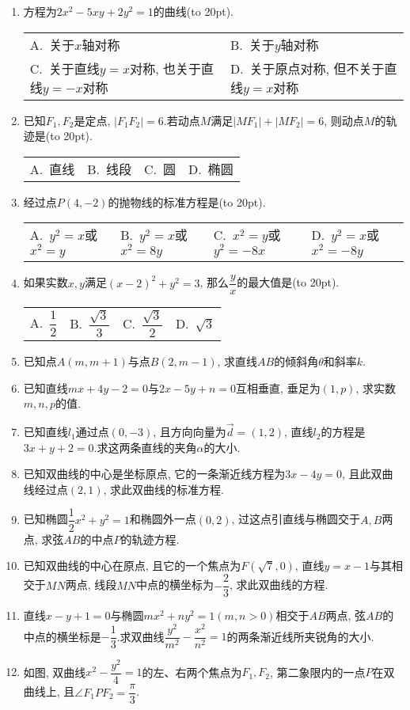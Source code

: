 \documentclass[10pt,a4paper]{article}
\newcommand{\bracket}[1]{(\hbox to #1pt{})}
\newcommand{\twoch}[4]{\par\begin{tabular}{p{.46\textwidth}p{.46\textwidth}}
A.~#1& B.~#2\\
C.~#3& D.~#4
\end{tabular}}
\newcommand{\fourch}[4]{\par\begin{tabular}{p{.23\textwidth}p{.23\textwidth}p{.23\textwidth}p{.23\textwidth}}
A.~#1 &B.~#2& C.~#3& D.~#4
\end{tabular}}
\begin{document}
\begin{enumerate}[1.]
\item 方程为$2x^2-5xy+2y^2=1$的曲线\bracket{20}.
\twoch{关于$x$轴对称}{关于$y$轴对称}{关于直线$y=x$对称, 也关于直线$y=-x$对称}{关于原点对称, 但不关于直线$y=x$对称}
\item 已知$F_1,F_2$是定点, $|F_1F_2|=6$.若动点$M$满足$|MF_1|+|MF_2|=6$, 则动点$M$的轨迹是\bracket{20}.
\fourch{直线}{线段}{圆}{椭圆}
\item 经过点$P(4,-2)$的抛物线的标准方程是\bracket{20}.
\fourch{$y^2=x$或$x^2=y$}{$y^2=x$或$x^2=8y$}{$x^2=y$或$y^2=-8x$}{$y^2=x$或$x^2=-8y$}
\item 如果实数$x,y$满足$(x-2)^2+y^2=3$, 那么$\dfrac yx$的最大值是\bracket{20}.
\fourch{$\dfrac 12$}{$\dfrac{\sqrt 3}3$}{$\dfrac{\sqrt 3}2$}{$\sqrt 3$}
\item 已知点$A(m,m+1)$与点$B(2,m-1)$, 求直线$AB$的倾斜角$\theta$和斜率$k$.
\item 已知直线$mx+4y-2=0$与$2x-5y+n=0$互相垂直, 垂足为$(1,p)$, 求实数$m,n,p$的值.
\item 已知直线$l_1$通过点$(0,-3)$, 且方向向量为$\overrightarrow d=(1,2)$, 直线$l_2$的方程是$3x+y+2=0$.求这两条直线的夹角$\alpha$的大小.
\item 已知双曲线的中心是坐标原点, 它的一条渐近线方程为$3x-4y=0$, 且此双曲线经过点$(2,1)$, 求此双曲线的标准方程.
\item 已知椭圆$\dfrac 12x^2+y^2=1$和椭圆外一点$(0,2)$, 过这点引直线与椭圆交于$A,B$两点, 求弦$AB$的中点$P$的轨迹方程.
\item 已知双曲线的中心在原点, 且它的一个焦点为$F(\sqrt 7,0)$, 直线$y=x-1$与其相交于$MN$两点, 线段$MN$中点的横坐标为$-\dfrac 23$, 求此双曲线的方程.
\item 直线$x-y+1=0$与椭圆$mx^2+ny^2=1(m,n>0)$相交于$AB$两点, 弦$AB$的中点的横坐标是$-\dfrac 13$.求双曲线$\dfrac{y^2}{m^2}-\dfrac{x^2}{n^2}=1$的两条渐近线所夹锐角的大小.
\item 如图, 双曲线$x^2-\dfrac{y^2}4=1$的左、右两个焦点为$F_1,F_2$, 第二象限内的一点$P$在双曲线上, 且$\angle F_1PF_2=\dfrac{\pi }3$.
\begin{center}
\end{center}
\end{enumerate}
\end{document}
